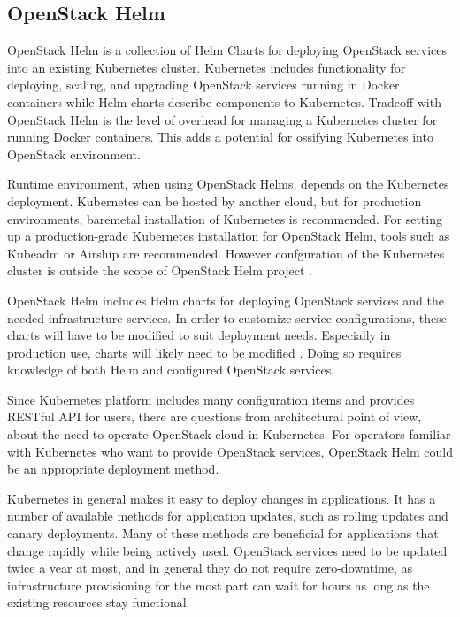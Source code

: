\documentclass[officiallayout]{tktla}
\begin{document}
\subsection{OpenStack Helm}

OpenStack Helm \cite{openstack-helm} is a collection of Helm Charts for
deploying OpenStack services into an existing Kubernetes cluster. Kubernetes
includes functionality for deploying, scaling, and upgrading OpenStack services
running in Docker containers while Helm charts describe components to
Kubernetes. Tradeoff with OpenStack Helm is the level of overhead for managing
a Kubernetes cluster for running Docker containers. This adds a potential for
ossifying Kubernetes into OpenStack environment.

Runtime environment, when using OpenStack Helms, depends on the Kubernetes
deployment. Kubernetes can be hosted by another cloud, but for production
environments, baremetal installation of Kubernetes is recommended. For setting
up a production-grade Kubernetes installation for OpenStack Helm, tools such as
Kubeadm or Airship \cite{airship} are recommended. However confguration of the
Kubernetes cluster is outside the scope of OpenStack Helm project
\cite{openstack-helm}.

OpenStack Helm includes Helm charts for deploying OpenStack services and the
needed infrastructure services. In order to customize service configurations,
these charts will have to be modified to suit deployment needs. Especially in
production use, charts will likely need to be modified \cite{openstack-helm}.
Doing so requires knowledge of both Helm and configured OpenStack services.

Since Kubernetes platform includes many configuration items and provides
RESTful API for users, there are questions from architectural point of view,
about the need to operate OpenStack cloud in Kubernetes. For operators familiar
with Kubernetes who want to provide OpenStack services, OpenStack Helm could be
an appropriate deployment method.

Kubernetes in general makes it easy to deploy changes in applications. It has a
number of available methods for application updates, such as rolling updates
and canary deployments. Many of these methods are beneficial for applications
that change rapidly while being actively used. OpenStack services need to be
updated twice a year at most, and in general they do not require zero-downtime,
as infrastructure provisioning for the most part can wait for hours as long as
the existing resources stay functional.
\end{document}
